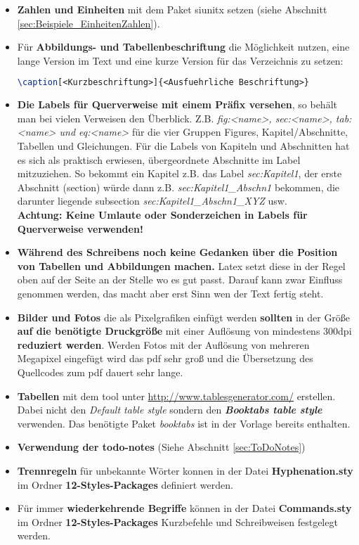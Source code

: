 \begin{itemize}
	\item \textbf{Zahlen und Einheiten} mit dem Paket siunitx setzen (siehe Abschnitt \ref{sec:Beispiele_EinheitenZahlen}).
	\item Für \textbf{Abbildungs- und Tabellenbeschriftung} die Möglichkeit nutzen, eine lange Version im Text und eine kurze Version für das Verzeichnis zu setzen:
	\begin{lstlisting}[language=tex]
\caption[<Kurzbeschriftung>]{<Ausfuehrliche Beschriftung>}\end{lstlisting}
    \item \textbf{Die Labels für Querverweise mit einem Präfix versehen}, so behält man bei vielen Verweisen den Überblick. Z.B. \textit{fig:<name>, sec:<name>, tab:<name> und eq:<name>} für die vier Gruppen Figures, Kapitel/Abschnitte, Tabellen und Gleichungen.
    Für die Labels von Kapiteln und Abschnitten hat es sich als praktisch erwiesen, übergeordnete Abschnitte im Label mitzuziehen. So bekommt ein Kapitel z.B. das Label \textit{sec:Kapitel1}, der erste Abschnitt (section) würde dann z.B. \textit{sec:Kapitel1\_Abschn1} bekommen, die darunter liegende subsection \textit{sec:Kapitel1\_Abschn1\_XYZ} usw.\\
    \textbf{Achtung: Keine Umlaute oder Sonderzeichen in Labels für Querverweise verwenden!}
	\item \textbf{Während des Schreibens noch keine Gedanken über die Position von Tabellen und Abbildungen machen.}
	Latex setzt diese in der Regel oben auf der Seite an der Stelle wo es gut passt.
	Darauf kann zwar Einfluss genommen werden, das macht aber erst Sinn wen der Text fertig steht.
	\item \textbf{Bilder und Fotos} die als Pixelgrafiken einfügt werden \textbf{sollten} in der Größe \textbf{auf die benötigte Druckgröße} mit einer Auflösung von mindestens 300dpi \textbf{reduziert werden}.
	Werden Fotos mit der Auflösung von mehreren Megapixel eingefügt wird das pdf sehr groß und die Übersetzung des Quellcodes zum pdf dauert sehr lange.
	\item \textbf{Tabellen} mit dem tool unter \url{http://www.tablesgenerator.com/} erstellen. Dabei nicht den \textit{Default table style} sondern den \textbf{\textit{Booktabs table style}} verwenden. Das benötigte Paket \textit{booktabs} ist in der Vorlage bereits enthalten.
	\item \textbf{Verwendung der todo-notes} (Siehe Abschnitt \ref{sec:ToDoNotes})
	\item \textbf{Trennregeln} für unbekannte Wörter konnen in der Datei \textbf{Hyphenation.sty} im Ordner \textbf{12-Styles-Packages} definiert werden.
	\item Für immer \textbf{wiederkehrende Begriffe} können in der Datei \textbf{Commands.sty} im Ordner \textbf{12-Styles-Packages} Kurzbefehle und Schreibweisen festgelegt werden.
\end{itemize}
%
%
%
\newpage

